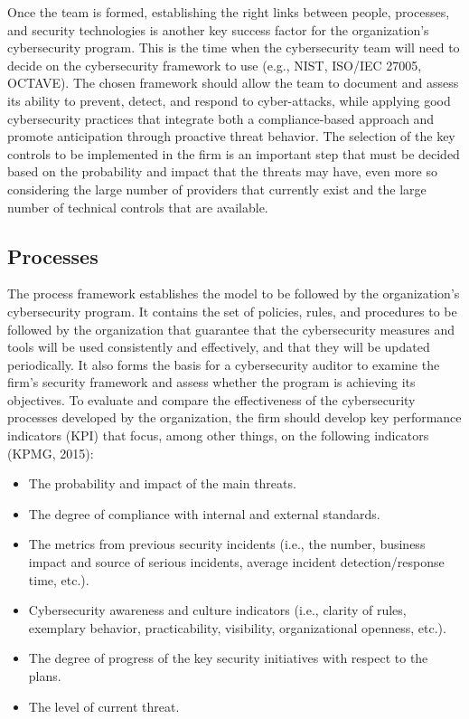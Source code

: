 \documentclass[
  letterpaper,
  DIV=11,
  numbers=noendperiod]{scrreprt}
\begin{document}
Once the team is formed, establishing the right links between people,
processes, and security technologies is another key success factor for
the organization's cybersecurity program. This is the time when the
cybersecurity team will need to decide on the cybersecurity framework to
use (e.g., NIST, ISO/IEC 27005, OCTAVE). The chosen framework should
allow the team to document and assess its ability to prevent, detect,
and respond to cyber-attacks, while applying good cybersecurity
practices that integrate both a compliance-based approach and promote
anticipation through proactive threat behavior. The selection of the key
controls to be implemented in the firm is an important step that must be
decided based on the probability and impact that the threats may have,
even more so considering the large number of providers that currently
exist and the large number of technical controls that are available.

\hypertarget{processes}{%
\subsection{Processes}\label{processes}}

The process framework establishes the model to be followed by the
organization's cybersecurity program. It contains the set of policies,
rules, and procedures to be followed by the organization that guarantee
that the cybersecurity measures and tools will be used consistently and
effectively, and that they will be updated periodically. It also forms
the basis for a cybersecurity auditor to examine the firm's security
framework and assess whether the program is achieving its objectives. To
evaluate and compare the effectiveness of the cybersecurity processes
developed by the organization, the firm should develop key performance
indicators (KPI) that focus, among other things, on the following
indicators (KPMG, 2015):

\begin{itemize}
\item
  The probability and impact of the main threats.
\item
  The degree of compliance with internal and external standards.
\item
  The metrics from previous security incidents (i.e., the number,
  business impact and source of serious incidents, average incident
  detection/response time, etc.).
\item
  Cybersecurity awareness and culture indicators (i.e., clarity of
  rules, exemplary behavior, practicability, visibility, organizational
  openness, etc.).
\item
  The degree of progress of the key security initiatives with respect to
  the plans.
\item
  The level of current threat.
\end{itemize}
\end{document}
